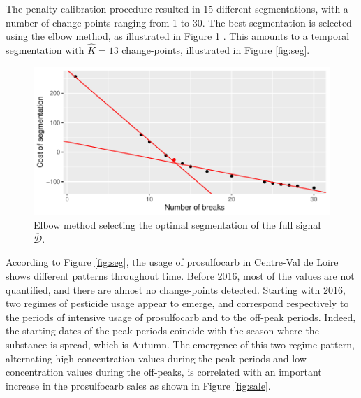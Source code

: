 

The penalty calibration procedure resulted in 15 different segmentations, with a number of change-points ranging from 1 to 30. The best segmentation is selected using the elbow method, as illustrated in Figure \ref{fig:elb_seg} . This amounts to a temporal segmentation with $\hat K=13$ change-points, illustrated in Figure \ref{fig:seg}. 
\begin{figure}[htbp]
  \centering
  \includegraphics[]{figs/App/Elbow_seg.pdf}
  \caption{Elbow method selecting the optimal segmentation of the full signal $\overline{\mathcal{D}}$.}
  \label{fig:elb_seg}
\end{figure} 

According to Figure \ref{fig:seg}, the usage of prosulfocarb in Centre-Val de Loire shows different patterns throughout time. Before 2016, most of the values are not quantified, and there are almost no change-points detected. Starting with 2016, two regimes of pesticide usage appear to emerge, and correspond respectively to the periods of intensive usage of prosulfocarb and to the off-peak periods. Indeed, the starting dates of the peak periods coincide with the season where the substance is spread, which is Autumn. The emergence of this two-regime pattern, alternating high concentration values during the peak periods and low concentration values during the off-peaks, is correlated with an important increase in the prosulfocarb sales as shown in Figure \ref{fig:sale}. 

